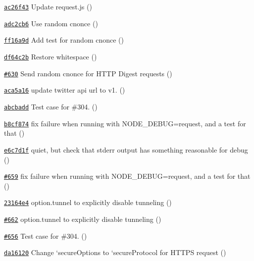 \begin{DoxyItemize}
\item \href{https://github.com/mikeal/request/commit/ac26f43d9a8212289f92056d3029c207f755cef4}{\tt ac26f43} Update request.\+js ()
\item \href{https://github.com/mikeal/request/commit/adc2cb6721e5980e8ed667a3f558cce8c89ee6c2}{\tt adc2cb6} Use random cnonce ()
\item \href{https://github.com/mikeal/request/commit/ff16a9daf93e01cecee7fabec64c3e1b423f7db5}{\tt ff16a9d} Add test for random cnonce ()
\item \href{https://github.com/mikeal/request/commit/df64c2bc8f691ecc6f6c214e2254bab439830b88}{\tt df64c2b} Restore whitespace ()
\item \href{https://github.com/mikeal/request/pull/630}{\tt \#630} Send random cnonce for H\+T\+T\+P Digest requests ()
\item \href{https://github.com/mikeal/request/commit/aca5a169c44cc658e8310691a2ae1cfc4c2b0958}{\tt aca5a16} update twitter api url to v1. ()
\item \href{https://github.com/mikeal/request/commit/abcbadd1b2a113c34a37b62d36ddcfd74452850e}{\tt abcbadd} Test case for \#304. ()
\item \href{https://github.com/mikeal/request/commit/b8cf8743b66d8eee4048561a7d81659f053393c8}{\tt b8cf874} fix failure when running with N\+O\+D\+E\+\_\+\+D\+E\+B\+U\+G=request, and a test for that ()
\item \href{https://github.com/mikeal/request/commit/e6c7d1f6d23922480c09427d5f54f84eec60b7af}{\tt e6c7d1f} quiet, but check that stderr output has something reasonable for debug ()
\item \href{https://github.com/mikeal/request/pull/659}{\tt \#659} fix failure when running with N\+O\+D\+E\+\_\+\+D\+E\+B\+U\+G=request, and a test for that ()
\item \href{https://github.com/mikeal/request/commit/23164e4f33bd0837d796037c3d0121db23653c34}{\tt 23164e4} option.\+tunnel to explicitly disable tunneling ()
\item \href{https://github.com/mikeal/request/pull/662}{\tt \#662} option.\+tunnel to explicitly disable tunneling ()
\item \href{https://github.com/mikeal/request/pull/656}{\tt \#656} Test case for \#304. ()
\item \href{https://github.com/mikeal/request/commit/da16120a8f0751b305a341c012dbdcfd62e83585}{\tt da16120} Change `secure\+Options\textquotesingle{} to `secure\+Protocol\textquotesingle{} for H\+T\+T\+P\+S request ()

\end{DoxyItemize}
